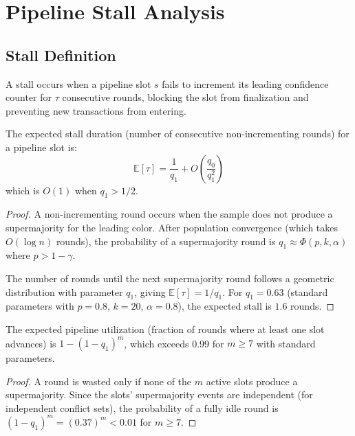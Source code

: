 \section{Pipeline Stall Analysis}

\label{sec:photon-stalls}

\subsection{Stall Definition}

\begin{definition}
A stall occurs when a pipeline slot $s$ fails to increment its leading confidence
counter for $\tau$ consecutive rounds, blocking the slot from finalization and preventing
new transactions from entering.
\end{definition}

\begin{theorem}
\label{thm:photon-stall}
The expected stall duration (number of consecutive non-incrementing rounds) for a
pipeline slot is:
\[
\mathbb{E}[\tau] = \frac{1}{q_1} + O\left(\frac{q_0}{q_1^2}\right)
\]
which is $O(1)$ when $q_1 > 1/2$.
\end{theorem}

\begin{proof}
A non-incrementing round occurs when the sample does not produce a supermajority for
the leading color. After population convergence (which takes $O(\log n)$ rounds), the
probability of a supermajority round is $q_1 \approx \Phi(p, k, \alpha)$ where $p > 1 - \gamma$.

The number of rounds until the next supermajority round follows a geometric distribution
with parameter $q_1$, giving $\mathbb{E}[\tau] = 1/q_1$. For $q_1 = 0.63$ (standard
parameters with $p = 0.8$, $k = 20$, $\alpha = 0.8$), the expected stall is $1.6$ rounds.
\end{proof}

\begin{corollary}
\label{cor:utilization}
The expected pipeline utilization (fraction of rounds where at least one slot advances)
is $1 - (1 - q_1)^m$, which exceeds 0.99 for $m \geq 7$ with standard parameters.
\end{corollary}

\begin{proof}
A round is wasted only if none of the $m$ active slots produce a supermajority. Since
the slots' supermajority events are independent (for independent conflict sets), the
probability of a fully idle round is $(1 - q_1)^m = (0.37)^m < 0.01$ for $m \geq 7$.
\end{proof}


